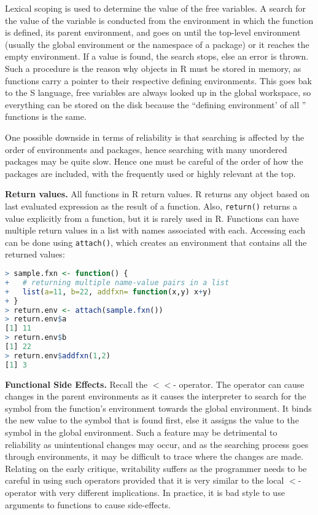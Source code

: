 \documentclass[12pt]{article}
\begin{document}
Lexical scoping is used to determine the value of the free variables. A search for the value of the variable is conducted from the environment in which the function is defined, its parent environment, and goes on until the top-level environment (usually the global environment or the namespace of a package) or it reaches the empty environment. If a value is found, the search stops, else an error is thrown. Such a procedure is the reason why objects in R must be stored in memory, as functions carry a pointer to their respective defining environments. This goes bak to the S language, free variables are always looked up in the global workspace, so everything can be stored on the disk because the ``defining environment' of all '' functions is the same.

One possible downside in terms of reliability is that searching is affected by the order of environments and packages, hence searching with many unordered packages may be quite slow. Hence one must be careful of the order of how the packages are included, with the frequently used or highly relevant at the top.

\textbf{Return values.} All functions in R return values. R returns any object based on last evaluated expression  as the result of a function. Also, \texttt{return()} returns a value explicitly from a function, but it is rarely used in R. Functions can have multiple return values in a list with names associated with each. Accessing each can be done using \texttt{attach()}, which creates an environment that contains all the returned values:

\begin{lstlisting}[language=R, frame=none]
> sample.fxn <- function() {
+ 	# returning multiple name-value pairs in a list
+	list(a=11, b=22, addfxn= function(x,y) x+y)
+ }
> return.env <- attach(sample.fxn())
> return.env$a
[1] 11
> return.env$b
[1] 22
> return.env$addfxn(1,2)
[1] 3
\end{lstlisting}

\textbf{Functional Side Effects.} Recall the \(<<\)- operator. The operator can cause changes in the parent environments as it causes the interpreter to search for the symbol from the function's environment towards the global environment. It binds the new value to the symbol that is found first, else it assigns the value to the symbol in the global environment. Such a feature may be detrimental to reliability as unintentional changes may occur, and as the searching process goes through environments, it may be difficult to trace where the changes are made. Relating on the early critique, writability suffers as the programmer needs to be careful in using such operators provided that it is very similar to the local \(<\)- operator with very different implications. In practice, it is bad style to use arguments to functions to cause side-effects.
\end{document}
